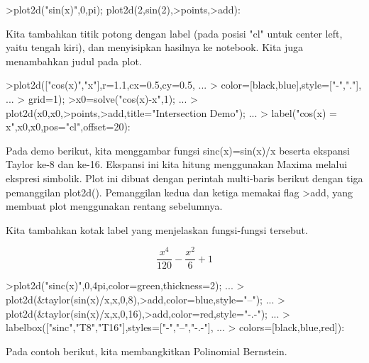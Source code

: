 \documentclass[a4paper,10pt]{article}
\begin{document}
\begin{eulernotebook}
\begin{eulercomment}
\begin{eulercomment}
\begin{eulercomment}
\begin{eulercomment}
\begin{eulercomment}
\begin{eulercomment}
\begin{eulerprompt}
>plot2d("sin(x)",0,pi); plot2d(2,sin(2),>points,>add):
\end{eulerprompt}
\begin{eulercomment}
Kita tambahkan titik potong dengan label (pada posisi "cl" untuk center left, yaitu
tengah kiri), dan menyisipkan hasilnya ke notebook. Kita juga menambahkan judul pada
plot.
\end{eulercomment}
\begin{eulerprompt}
>plot2d(["cos(x)","x"],r=1.1,cx=0.5,cy=0.5, ...
>  color=[black,blue],style=["-","."], ...
>  grid=1);
>x0=solve("cos(x)-x",1);  ...
>  plot2d(x0,x0,>points,>add,title="Intersection Demo");  ...
>  label("cos(x) = x",x0,x0,pos="cl",offset=20):
\end{eulerprompt}
\begin{eulercomment}
Pada demo berikut, kita menggambar fungsi sinc(x)=sin(x)/x beserta ekspansi Taylor
ke-8 dan ke-16. Ekspansi ini kita hitung menggunakan Maxima melalui ekspresi simbolik.
Plot ini dibuat dengan perintah multi-baris berikut dengan tiga pemanggilan plot2d().
Pemanggilan kedua dan ketiga memakai flag \textgreater{}add, yang membuat plot menggunakan rentang
sebelumnya.

Kita tambahkan kotak label yang menjelaskan fungsi-fungsi tersebut.
\end{eulercomment}
\begin{eulerformula}
\[
\frac{x^4}{120}-\frac{x^2}{6}+1
\]
\end{eulerformula}
\begin{eulerprompt}
>plot2d("sinc(x)",0,4pi,color=green,thickness=2); ...
>  plot2d(&taylor(sin(x)/x,x,0,8),>add,color=blue,style="--"); ...
>  plot2d(&taylor(sin(x)/x,x,0,16),>add,color=red,style="-.-"); ...
>  labelbox(["sinc","T8","T16"],styles=["-","--","-.-"], ...
>    colors=[black,blue,red]):
\end{eulerprompt}
\begin{eulercomment}
Pada contoh berikut, kita membangkitkan Polinomial Bernstein.


\end{eulercomment}
\end{eulercomment}
\end{eulercomment}
\end{eulercomment}
\end{eulercomment}
\end{eulercomment}
\end{eulercomment}
\end{eulernotebook}
\end{document}
